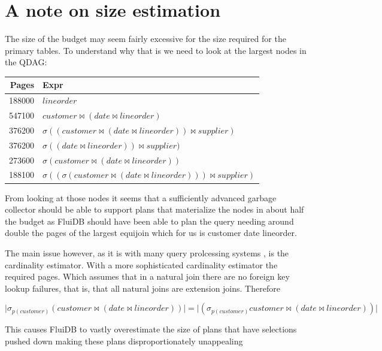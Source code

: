 \section{A note on size estimation}
\label{sec:size_estimation_problems}
The size of the budget may seem fairly excessive for the size required
for the primary tables. To understand why that is we need to look at
the largest nodes in the QDAG:

\begin{center}
\begin{tabular}{rl}
Pages & Expr\\
\hline
188000 & \(lineorder\)\\
547100 & \(customer \Join (date \Join lineorder)\)\\
376200 & \(\sigma ((customer \Join (date \Join lineorder)) \Join supplier)\)\\
376200 & \(\sigma ((date \Join lineorder)) \Join supplier)\)\\
273600 & \(\sigma (customer \Join (date \Join lineorder))\)\\
188100 & \(\sigma ((\sigma (customer \Join (date \Join lineorder))) \Join supplier)\)\\
\end{tabular}
\end{center}

From looking at those nodes it seems that a sufficiently advanced
garbage collector should be able to support plans that materialize the
nodes in about half the budget as FluiDB should have been able to plan
the query needing around double the pages of the largest equijoin
which for us is customer date lineorder.

The main issue however, as it is with many query prolcessing systems
\cite{leisHowGoodAre2015}, is the cardinality estimator. With a more
sophisticated cardinality estimator the required pages. Which assumes
that in a natural join there are no foreign key lookup failures, that
is, that all natural joins are extension joins. Therefore

\[
\lvert \sigma _{p(customer)} (customer \Join (date \Join lineorder)) \rvert = \lvert (\sigma _{p(customer)} customer \Join (date \Join lineorder)) \rvert
\]


This causes FluiDB to vastly overestimate the size of plans that have
selections pushed down making these plans disproportionately
unappealing

